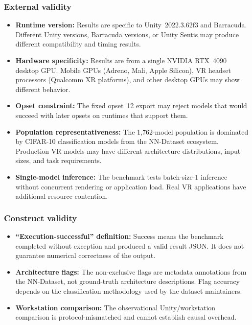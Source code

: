 \documentclass[10pt,twocolumn]{article}
\begin{document}
\subsubsection{External validity}

\begin{itemize}[nosep,leftmargin=*]
  \item \textbf{Runtime version:} Results are specific to Unity~2022.3.62f3 and Barracuda. Different Unity versions, Barracuda versions, or Unity Sentis may produce different compatibility and timing results.
  \item \textbf{Hardware specificity:} Results are from a single NVIDIA RTX~4090 desktop GPU. Mobile GPUs (Adreno, Mali, Apple Silicon), VR headset processors (Qualcomm XR platforms), and other desktop GPUs may show different behavior.
  \item \textbf{Opset constraint:} The fixed opset~12 export may reject models that would succeed with later opsets on runtimes that support them.
  \item \textbf{Population representativeness:} The 1,762-model population is dominated by CIFAR-10 classification models from the NN-Dataset ecosystem. Production VR models may have different architecture distributions, input sizes, and task requirements.
  \item \textbf{Single-model inference:} The benchmark tests batch-size-1 inference without concurrent rendering or application load. Real VR applications have additional resource contention.
\end{itemize}

\subsubsection{Construct validity}

\begin{itemize}[nosep,leftmargin=*]
  \item \textbf{``Execution-successful'' definition:} Success means the benchmark completed without exception and produced a valid result JSON. It does not guarantee numerical correctness of the output.
  \item \textbf{Architecture flags:} The non-exclusive flags are metadata annotations from the NN-Dataset, not ground-truth architecture descriptions. Flag accuracy depends on the classification methodology used by the dataset maintainers.
  \item \textbf{Workstation comparison:} The observational Unity/workstation comparison is protocol-mismatched and cannot establish causal overhead.
\end{itemize}
\end{document}
